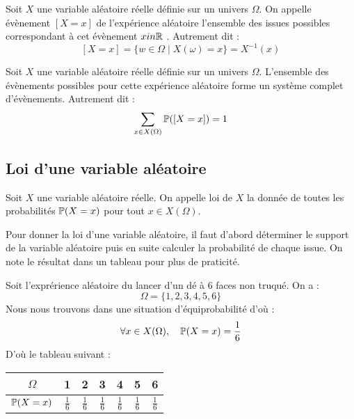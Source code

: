 \begin{definition}
    Soit $X$ une variable aléatoire réelle définie sur un univers $\Omega$. 
    On appelle évènement $[X = x]$ de l'expérience aléatoire l'ensemble des issues possibles correspondant à cet évènement $x in \mathbb{R}$ . 
    Autrement dit :
        \[ [X = x] = \{w \in \Omega \; | \; X(\omega) = x\} = X^{-1}(x) \] 
\end{definition}

\begin{proposition}
    Soit $X$ une variable aléatoire réelle définie sur un univers $\Omega$. 
    L'ensemble des évènements possibles pour cette expérience aléatoire forme un système complet d'évènements. 
    Autrement dit : 
        \[ \sum_{x \in X(\Omega)} { \mathbb{P} ([X = x])} = 1 \] 
\end{proposition}

\subsection{Loi d'une variable aléatoire}

\begin{definition}[Loi]
    Soit $X$ une variable aléatoire réelle. On appelle loi de $X$ la donnée de toutes les probabilités $ \mathbb{P}(X = x)$ pour 
    tout $x \in X(\Omega)$.  
\end{definition}

Pour donner la loi d'une variable aléatoire, il faut d'abord déterminer le support de la variable aléatoire puis en suite 
calculer la probabilité de chaque issue. 
On note le résultat dans un tableau pour plus de praticité. 

\begin{example}
    Soit l'exprérience aléatoire du lancer d'un dé à 6 faces non truqué. On a :
        \[ \Omega = \{1,2,3,4,5,6\} \]
    Nous nous trouvons dans une situation d'équiprobabilité d'où :
        \[ \forall x \in X(\Omega), \quad \mathbb{P}(X = x) = \frac{1}{6} \]
    D'où le tableau suivant :
    \begin{center}
        \begin{tabular}{c|c|c|c|c|c|c}
            $\Omega$ & 1 & 2 & 3 & 4 & 5 & 6 \\
            \hline 
            $ \mathbb{P}(X = x)$ & $\frac{1}{6}$ & $\frac{1}{6}$ & $\frac{1}{6}$ & $\frac{1}{6}$ & $\frac{1}{6}$ & $\frac{1}{6}$ \\ 
        \end{tabular}
    \end{center}  
\end{example}

